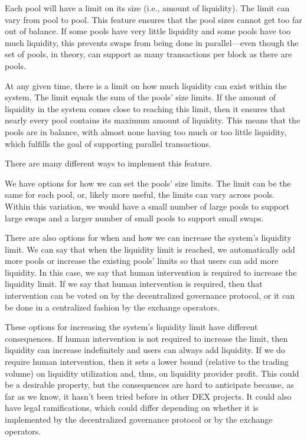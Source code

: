 \documentclass[12pt]{article}
\begin{document}
Each pool will have a limit on its size (i.e., amount of liquidity). The limit can vary from pool to pool. This feature ensures that the pool sizes cannot get too far out of
balance. If some pools have very little liquidity and some pools have too much liquidity,
this prevents swaps from being done in parallel—even though the set of
pools, in theory, can support as many transactions per block as there are pools. 

At any given time, there is a limit on how much liquidity can exist within the system. The limit equals the sum of the pools' size limits. If the amount of liquidity in the system comes close to reaching this limit, then it ensures that nearly every pool contains its maximum amount of liquidity. This means that the pools are in balance, with almost none having too much or too little liquidity, which fulfills the goal of supporting parallel transactions.

There are many different ways to implement this feature.

We have options for how we can set the pools' size limits. The limit can be the same for each pool, or, likely more useful, the limits can vary across pools. Within this variation, we would have a small number of large pools to support large swaps and a larger number of small pools to support small swaps.

There are also options for when and how we can increase the system's liquidity limit. We can say that when the liquidity limit is reached, we automatically add more pools or increase the existing pools' limits so that users can add more liquidity. In this case, we say that human intervention is required to increase the liquidity limit. If we say that human intervention is required, then that intervention can be voted on by the decentralized governance protocol, or it can be done in a centralized fashion by the exchange operators.

These options for increasing the system's liquidity limit have different consequences. If human intervention is not required to increase the limit, then liquidity can increase indefinitely and users can always add liquidity. If we do require human intervention, then it sets a lower bound (relative to the trading volume) on liquidity utilization and, thus, on liquidity provider profit.
This could be a desirable property, but the consequences are hard to anticipate because, as far as we know, it hasn't been tried before in other DEX projects. It could also have legal ramifications, which could differ depending on whether it is implemented by the decentralized governance protocol or by the exchange operators.
\end{document}
